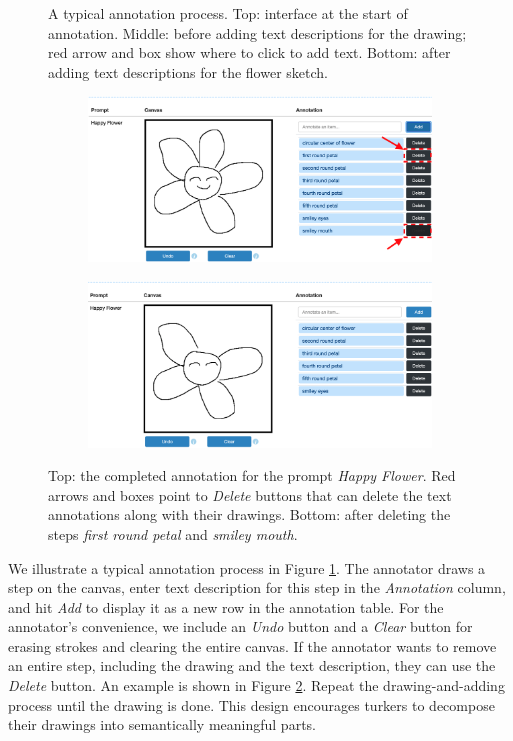\begin{figure}[!htb]
\begin{subfigure}{\textwidth}
\end{subfigure}
\caption{A typical annotation process. Top: interface at the start of annotation. Middle: before adding text descriptions for the drawing; red arrow and box show where to click to add text. Bottom: after adding text descriptions for the flower sketch.}
\label{v1.main_task.1}
\end{figure}

\begin{figure}[!htb]
\begin{subfigure}{\textwidth}
\centering
\includegraphics[width=.8\linewidth]{data_collection/v1_before_delete.png}  
\end{subfigure}
\newline
\begin{subfigure}{\textwidth}
\centering
\includegraphics[width=.8\linewidth]{data_collection/v1_after_delete.png}  
\end{subfigure}
\caption{Top: the completed annotation for the prompt \textit{Happy Flower}. Red arrows and boxes point to \textit{Delete} buttons that can delete the text annotations along with their drawings. Bottom: after deleting the steps \textit{first round petal} and \textit{smiley mouth}.}
\label{v1.main_task.delete}
\end{figure}

We illustrate a typical annotation process in Figure \ref{v1.main_task.1}. 
The annotator draws a step on the canvas, enter text description for this step in the \textit{Annotation} column, and hit \textit{Add} to display it as a new row in the annotation table. 
For the annotator's convenience, we include an \textit{Undo} button and a \textit{Clear} button for erasing strokes and clearing the entire canvas. 
If the annotator wants to remove an entire step, including the drawing and the text description, they can use the \textit{Delete} button. An example is shown in Figure \ref{v1.main_task.delete}.
Repeat the drawing-and-adding process until the drawing is done. 
This design encourages turkers to decompose their drawings into semantically meaningful parts.


